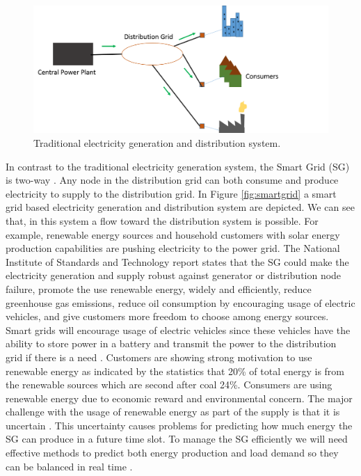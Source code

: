 \begin{figure}[h]
  \includegraphics[width=\linewidth]{traditional.png}
  \caption{Traditional electricity generation and distribution system.}
  \label{fig:tradgrid}
\end{figure}

In contrast to the traditional electricity generation system, the Smart Grid (SG) is two-way \cite{fang2012smart}. Any node in the distribution grid can both consume and produce electricity to supply to the distribution grid. In Figure \ref{fig:smartgrid} a smart grid based electricity generation and distribution system are depicted. We can see that, in this system a flow toward the distribution system is possible. For example, renewable energy sources and household customers with solar energy production capabilities are pushing electricity to the power grid. The National Institute of Standards and Technology report states that the SG could make the electricity generation and supply robust against generator or distribution node failure, promote the use renewable energy, widely and efficiently, reduce greenhouse gas emissions, reduce oil consumption by encouraging usage of electric vehicles, and give customers more freedom to choose among energy sources. Smart grids will encourage usage of electric vehicles since these vehicles have the ability to store power in a battery and transmit the power to the distribution grid if there is a need \cite{fang2012smart}. Customers are showing strong motivation to use renewable energy as indicated by the statistics that 20\% of total energy is from the renewable sources which are second after coal 24\%. Consumers are using renewable energy due to economic reward and environmental concern. The major challenge with the usage of renewable energy as part of the supply is that it is uncertain \cite{richter2012transitioning}. This uncertainty causes problems for predicting how much energy the SG can produce in a future time slot. To manage the SG efficiently we will need effective methods to predict both energy production and load demand so they can be balanced in real time \cite{potter2009building}.

